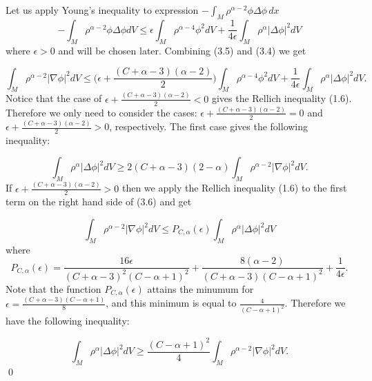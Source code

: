 \documentclass[12pt]{amsart}
\numberwithin{equation}{section}
\numberwithin{theorem}{section}
\numberwithin{theorem}{section} \numberwithin{lemma}{section}
\numberwithin{definition}{section}
\numberwithin{corollary}{section}
\numberwithin{remark}{section}
\numberwithin{proposition}{section}
\begin{document}
Let us apply Young's inequality to expression $-\int_M
\rho^{\alpha-2}\phi\Delta\phi\,dx$
\begin{equation}-\int_M \rho^{\alpha-2}\phi\Delta\phi dV
\le \epsilon \int_M
\rho^{\alpha-4}\phi^2dV+\frac{1}{4\epsilon}\int_M
\rho^{\alpha}|\Delta\phi|^2dV\end{equation}
 where $\epsilon>0$ and will be chosen later. Combining (3.5) and
 (3.4) we get

 \begin{equation}
\int_M \rho^{\alpha-2}|\nabla \phi|^2dV\le
\Big(\epsilon+\frac{(C+\alpha-3)(\alpha-2)}{2}\Big)\int_M
\rho^{\alpha-4}\phi^2dV+\frac{1}{4\epsilon} \int_M
\rho^{\alpha}|\Delta\phi|^2dV.
\end{equation}
Notice that the case of
$\epsilon+\frac{(C+\alpha-3)(\alpha-2)}{2}<0$ gives the Rellich
inequality (1.6). Therefore we only need to consider the cases:
$\epsilon+\frac{(C+\alpha-3)(\alpha-2)}{2}=0$  and
$\epsilon+\frac{(C+\alpha-3)(\alpha-2)}{2}>0$, respectively. The
first case gives the following inequality:

\begin{equation}
\int_M \rho^{\alpha}|\Delta\phi|^2dV\ge
2(C+\alpha-3)(2-\alpha)\int_M \rho^{\alpha-2}|\nabla \phi|^2dV.
\end{equation} If $\epsilon+\frac{(C+\alpha-3)(\alpha-2)}{2}>0$ then
we apply the Rellich inequality (1.6) to the first term on the
right hand side of (3.6) and get

\begin{equation}
\int_M \rho^{\alpha-2}|\nabla \phi|^2dV\le P_{C,\alpha}(\epsilon)
\int_M \rho^{\alpha}|\Delta\phi|^2dV
\end{equation}
where
\[P_{C,\alpha}(\epsilon)=\frac{16\epsilon}{(C+\alpha-3)^2(C-\alpha+1)^2}+\frac{8(\alpha-2)}{(C+\alpha-3)(C-\alpha+1)^2}+\frac{1}{4\epsilon}.\]  Note that the function $P_{C,\alpha}(\epsilon)$  attains the minumum for $\epsilon=\frac{(C+\alpha-3)(C-\alpha+1)}{8}$, and this minimum is equal to $\frac{4}{(C-\alpha+1)^2}$. Therefore we have the following inequality:

\[\int_M
\rho^{\alpha}|\Delta\phi|^2dV \ge \frac{(C-\alpha+1)^2}{4}\int_M
\rho^{\alpha-2}|\nabla \phi|^2dV.\] \qed
\medskip
\end{document}
